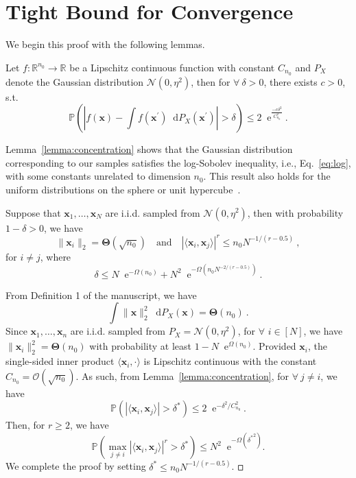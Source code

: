 \documentclass[review,10pt]{JMtemplate}
\newcommand*{\dif}{\mathop{}\!\mathrm{d}}
\newcommand*{\e}{\mathop{}\!\mathrm{e}}
\begin{document}
	
	
\section{Tight Bound for Convergence} \label{app:convergence}
We begin this proof with the following lemmas.
\begin{lemma} \label{lemma:concentration}
Let $f:\mathbb{R}^{n_0} \to \mathbb{R}$ be a Lipschitz continuous function with constant $C_{n_0}$ and $P_X$ denote the Gaussian distribution $\mathcal{N}(0,\eta^2)$, then for $\forall~ \delta>0$, there exists $c >0$, s.t.
\begin{equation} \label{eq:log}
	\mathbb{P} \left( \left| f(\boldsymbol{x})-\int f \left(\boldsymbol{x}^{\prime}\right) \dif P_{X}\left(\boldsymbol{x}^{\prime}\right) \right| > \delta \right) \leq 2 \e^\frac{-c \delta^{2}}{C_{n_0}^2} \ .
\end{equation}
\end{lemma}
Lemma~\ref{lemma:concentration} shows that the Gaussian distribution corresponding to our samples satisfies the log-Sobolev inequality, i.e., Eq.~\eqref{eq:log}, with some constants unrelated to dimension $n_0$. This result also holds for the uniform distributions on the sphere or unit hypercube~\cite{nguyen2021:eigenvalues}. 

\begin{lemma} \label{lemma:input}
Suppose that $\boldsymbol{x}_1, \dots, \boldsymbol{x}_N$ are i.i.d. sampled from $\mathcal{N}(0,\eta^2)$, then with probability $1-\delta>0$, we have 
\[
\|\boldsymbol{x}_i\|_2 = \mathbf{\Theta}(\sqrt{n_0}) \quad \text{and}\quad |\langle \boldsymbol{x}_i,\boldsymbol{x}_j \rangle|^r \leq n_0 N^{-1/(r-0.5)} \ , 
\]
for $i \neq j$, where
\[
\delta \leq N \e^{-\Omega(n_0)} + N^{2} \e^{-\Omega\left(n_0 N^{-2 /(r-0.5)}\right)} \ .
\]
\end{lemma}
From Definition 1 of the manuscript, we have
\[
\int\|\boldsymbol{x}\|_{2}^{2} \dif P_X(\boldsymbol{x}) = \mathbf{\Theta}(n_0) \ .
\]
Since $\boldsymbol{x}_1, \dots, \boldsymbol{x}_n$ are i.i.d. sampled from $P_X = \mathcal{N}(0,\eta^2)$, for $\forall$ $i\in[N]$, we have $\|\boldsymbol{x}_i\|_2^2 = \mathbf{\Theta}(n_0)$ with probability at least $1- N\e^{\Omega(n_0)}$. Provided $\boldsymbol{x}_i$, the single-sided inner product $\langle \boldsymbol{x}_i,\cdot \rangle$ is Lipschitz continuous with the constant $C_{n_0} = \mathcal{O}(\sqrt{n_0})$. As such, from Lemma~\ref{lemma:concentration}, for $\forall~ j\neq i$, we have
\[
\mathbb{P} \left( |\langle \boldsymbol{x}_i,\boldsymbol{x}_j \rangle| > \delta^* \right) \leq 2 \e^{-\delta^2/C_{n_0}^2} \ .
\]
Then, for $r \geq 2$, we have
\[
\mathbb{P} \left( \max_{j\neq i} |\langle \boldsymbol{x}_i,\boldsymbol{x}_j \rangle|^r > \delta^* \right) \leq N^{2} \e^{-\Omega\left( {\delta^*}^2\right)} .
\]
We complete the proof by setting $\delta^* \leq n_0N^{-1/(r-0.5)}$. 
$\hfill\square$
\end{document}
